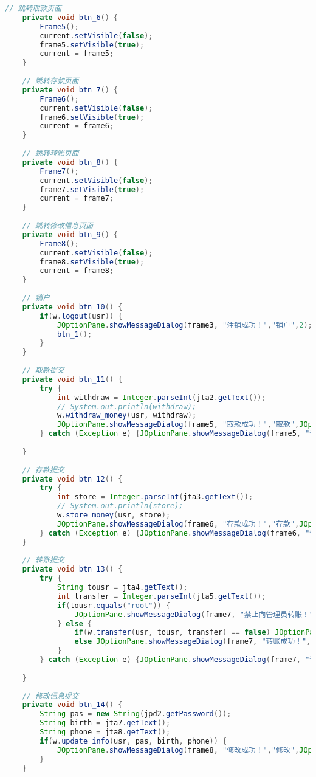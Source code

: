 \begin{lstlisting}[language = java, caption = UI.java]
	// 跳转取款页面
	private void btn_6() {
		Frame5();
		current.setVisible(false);
		frame5.setVisible(true);
		current = frame5;
	}
	
	// 跳转存款页面
	private void btn_7() {
		Frame6();
		current.setVisible(false);
		frame6.setVisible(true);
		current = frame6;
	}
	
	// 跳转转账页面
	private void btn_8() {
		Frame7();
		current.setVisible(false);
		frame7.setVisible(true);
		current = frame7;
	}
	
	// 跳转修改信息页面
	private void btn_9() {
		Frame8();
		current.setVisible(false);
		frame8.setVisible(true);
		current = frame8;
	}
	
	// 销户
	private void btn_10() {
		if(w.logout(usr)) {
			JOptionPane.showMessageDialog(frame3, "注销成功！","销户",2);
			btn_1();
		}
	}
	
	// 取款提交
	private void btn_11() {
		try {
			int withdraw = Integer.parseInt(jta2.getText());
			// System.out.println(withdraw);
			w.withdraw_money(usr, withdraw);
			JOptionPane.showMessageDialog(frame5, "取款成功！","取款",JOptionPane.PLAIN_MESSAGE);
		} catch (Exception e) {JOptionPane.showMessageDialog(frame5, "请输入数字！","格式错误",2);}
		
	}
	
	// 存款提交
	private void btn_12() {
		try {
			int store = Integer.parseInt(jta3.getText());
			// System.out.println(store);
			w.store_money(usr, store);
			JOptionPane.showMessageDialog(frame6, "存款成功！","存款",JOptionPane.PLAIN_MESSAGE);
		} catch (Exception e) {JOptionPane.showMessageDialog(frame6, "请输入数字！","格式错误",2);}
	}
	
	// 转账提交
	private void btn_13() {
		try {
			String tousr = jta4.getText();
			int transfer = Integer.parseInt(jta5.getText());
			if(tousr.equals("root")) {
				JOptionPane.showMessageDialog(frame7, "禁止向管理员转账！","错误",2);
			} else {
				if(w.transfer(usr, tousr, transfer) == false) JOptionPane.showMessageDialog(frame7, "转账失败！用户不存在或余额不足！","转账",JOptionPane.PLAIN_MESSAGE);
				else JOptionPane.showMessageDialog(frame7, "转账成功！","转账",JOptionPane.PLAIN_MESSAGE);
			}
		} catch (Exception e) {JOptionPane.showMessageDialog(frame7, "请输入数字！","格式错误",2);}
		
	}
	
	// 修改信息提交
	private void btn_14() {
		String pas = new String(jpd2.getPassword());
		String birth = jta7.getText();
		String phone = jta8.getText();
		if(w.update_info(usr, pas, birth, phone)) {
			JOptionPane.showMessageDialog(frame8, "修改成功！","修改",JOptionPane.PLAIN_MESSAGE);
		}
	}
	

\end{lstlisting}
